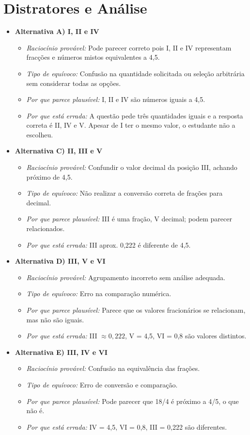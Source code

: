 \documentclass{article}
\begin{document}
\section{Distratores e Análise}
\begin{itemize}
  \item \textbf{Alternativa A) I, II e IV}
  \begin{itemize}
    \item \textit{Raciocínio provável:} Pode parecer correto pois I, II e IV representam fracções e números mistos equivalentes a 4,5.
    \item \textit{Tipo de equívoco:} Confusão na quantidade solicitada ou seleção arbitrária sem considerar todas as opções.
    \item \textit{Por que parece plausível:} I, II e IV são números iguais a 4,5.
    \item \textit{Por que está errada:} A questão pede três quantidades iguais e a resposta correta é II, IV e V. Apesar de I ter o mesmo valor, o estudante não a escolheu.
  \end{itemize}
  \item \textbf{Alternativa C) II, III e V}
  \begin{itemize}
    \item \textit{Raciocínio provável:} Confundir o valor decimal da posição III, achando próximo de 4,5.
    \item \textit{Tipo de equívoco:} Não realizar a conversão correta de frações para decimal.
    \item \textit{Por que parece plausível:} III é uma fração, V decimal; podem parecer relacionados.
    \item \textit{Por que está errada:} III aprox. 0,222 é diferente de 4,5.
  \end{itemize}
  \item \textbf{Alternativa D) III, V e VI}
  \begin{itemize}
    \item \textit{Raciocínio provável:} Agrupamento incorreto sem análise adequada.
    \item \textit{Tipo de equívoco:} Erro na comparação numérica.
    \item \textit{Por que parece plausível:} Parece que os valores fracionários se relacionam, mas não são iguais.
    \item \textit{Por que está errada:} III $\approx 0,222$, V = 4,5, VI = 0,8 são valores distintos.
  \end{itemize}
  \item \textbf{Alternativa E) III, IV e VI}
  \begin{itemize}
    \item \textit{Raciocínio provável:} Confusão na equivalência das frações.
    \item \textit{Tipo de equívoco:} Erro de conversão e comparação.
    \item \textit{Por que parece plausível:} Pode parecer que 18/4 é próximo a 4/5, o que não é.
    \item \textit{Por que está errada:} IV = 4,5, VI = 0,8, III = 0,222 são diferentes.
  \end{itemize}
\end{itemize}
\end{document}
